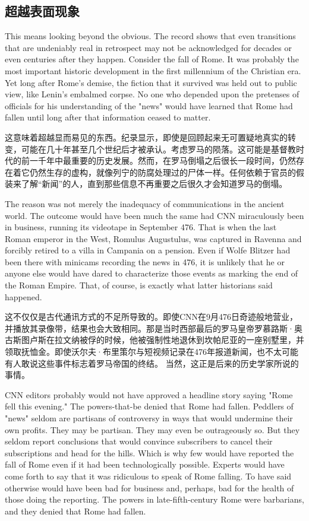 \subsection{超越表面现象}
\begin{paracol}{2}
This means looking beyond the obvious. The record shows that even transitions that are undeniably real in retrospect may not be acknowledged for decades or even centuries after they happen. Consider the fall of Rome. It was probably the most important historic development in the first millennium of the Christian era. Yet long after Rome's demise, the fiction that it survived was held out to public view, like Lenin's embalmed corpse. No one who depended upon the pretenses of officials for his understanding of the "news" would have learned that Rome had fallen until long after that information ceased to matter.  

\switchcolumn
这意味着超越显而易见的东西。纪录显示，即使是回顾起来无可置疑地真实的转变，可能在几十年甚至几个世纪后才被承认。考虑罗马的陨落。这可能是基督教时代的前一千年中最重要的历史发展。然而，在罗马倒塌之后很长一段时间，仍然存在着它仍然生存的虚构，就像列宁的防腐处理过的尸体一样。任何依赖于官员的假装来了解“新闻”的人，直到那些信息不再重要之后很久才会知道罗马的倒塌。

\switchcolumn*
The reason was not merely the inadequacy of communications in the ancient world. The outcome would have been much the same had CNN miraculously been in business, running its videotape in September 476. That is when the last Roman emperor in the West, Romulus Augustulus, was captured in Ravenna and forcibly retired to a villa in Campania on a pension. Even if Wolfe Blitzer had been there with minicams recording the news in 476, it is unlikely that he or anyone else would have dared to characterize those events as marking the end of the Roman Empire. That, of course, is exactly what latter historians said happened.

\switchcolumn
这不仅仅是古代通讯方式的不足所导致的。即使CNN在9月476日奇迹般地营业，并播放其录像带，结果也会大致相同。那是当时西部最后的罗马皇帝罗慕路斯·奥古斯图卢斯在拉文纳被俘的时候，他被强制性地退休到坎帕尼亚的一座别墅里，并领取抚恤金。即使沃尔夫·布里策尔与短视频记录在476年报道新闻，也不太可能有人敢说这些事件标志着罗马帝国的终结。 当然，这正是后来的历史学家所说的事情。

\switchcolumn*
CNN editors probably would not have approved a headline story saying "Rome fell this evening." The powers-that-be denied that Rome had fallen. Peddlers of "news" seldom are partisans of controversy in ways that would undermine their own profits. They may be partisan. They may even be outrageously so. But they seldom report conclusions that would convince subscribers to cancel their subscriptions and head for the hills. Which is why few would have reported the fall of Rome even if it had been technologically possible. Experts would have come forth to say that it was ridiculous to speak of Rome falling. To have said otherwise would have been bad for business and, perhaps, bad for the health of those doing the reporting. The powers in late-fifth-century Rome were barbarians, and they denied that Rome had fallen.


\end{paracol}
